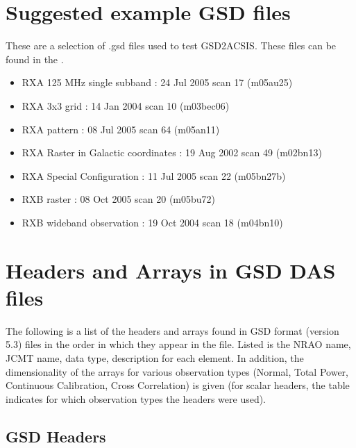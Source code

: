 \documentclass[twoside,11pt,nolof]{starlink}
\begin{document}
\section{Suggested example GSD files}

These are a selection of .gsd files used to test GSD2ACSIS.  These files can be found in the .

\begin{itemize}
\item RXA 125 MHz single subband : 24 Jul 2005 scan 17 (m05au25)
\item RXA 3x3 grid : 14 Jan 2004 scan 10 (m03bec06)
\item RXA pattern : 08 Jul 2005 scan 64 (m05an11)
\item RXA Raster in Galactic coordinates : 19 Aug 2002 scan 49 (m02bn13)
\item RXA Special Configuration : 11 Jul 2005 scan 22 (m05bn27b)
\item RXB raster : 08 Oct 2005 scan 20 (m05bu72)
\item RXB wideband observation : 19 Oct 2004 scan 18 (m04bn10)
\end{itemize}

\appendix

\section{Headers and Arrays in GSD DAS files}

The following is a list of the headers and arrays found in GSD format (version 5.3) files in the order in which they appear in the file.  Listed is the NRAO name, JCMT name, data type, description for each element.  In addition, the dimensionality of the arrays for various observation types (Normal, Total Power, Continuous Calibration, Cross Correlation) is given (for scalar headers, the table indicates for which observation types the headers were used).


\newpage
\subsection{GSD Headers}
\end{document}
